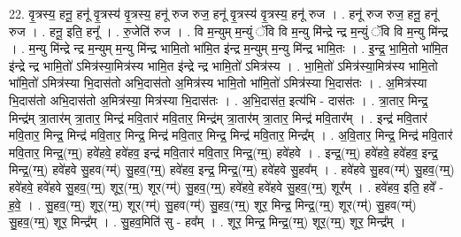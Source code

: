 \documentclass[17pt]{extarticle}
\begin{document}
22. वृ॒त्रस्य॒ हनू॒ हनू॑ वृ॒त्रस्य॑ वृ॒त्रस्य॒ हनू॑ रुज रुज॒ हनू॑ वृ॒त्रस्य॑ वृ॒त्रस्य॒ हनू॑ रुज । . हनू॑ रुज रुज॒ हनू॒ हनू॑ रुज । . हनू॒ इति॒ हनू᳚ । . रु॒जेति॑ रुज । . वि म॒न्युम् म॒न्युं ॅवि वि म॒न्यु मि॑न्द्रे न्द्र म॒न्युं ॅवि वि म॒न्यु मि॑न्द्र । . म॒न्यु मि॑न्द्रे न्द्र म॒न्युम् म॒न्यु मि॑न्द्र भामि॒तो भा॑मि॒त इ॑न्द्र म॒न्युम् म॒न्यु मि॑न्द्र भामि॒तः । . इ॒न्द्र॒ भा॒मि॒तो भा॑मि॒त इ॑न्द्रे न्द्र भामि॒तो॑ ऽमित्र॑स्या॒मित्र॑स्य भामि॒त इ॑न्द्रे न्द्र भामि॒तो॑ ऽमित्र॑स्य । . भा॒मि॒तो॑ ऽमित्र॑स्या॒मित्र॑स्य भामि॒तो भा॑मि॒तो॑ ऽमित्र॑स्या भि॒दास॑तो अभि॒दास॑तो अ॒मित्र॑स्य भामि॒तो भा॑मि॒तो॑ ऽमित्र॑स्या भि॒दास॑तः । . अ॒मित्र॑स्या भि॒दास॑तो अभि॒दास॑तो अ॒मित्र॑स्या॒ मित्र॑स्या भि॒दास॑तः । . अ॒भि॒दास॑त॒ इत्य॑भि - दास॑तः । . त्रा॒तार॒ मिन्द्र॒ मिन्द्र॑म् त्रा॒तार॑म् त्रा॒तार॒ मिन्द्र॑ मवि॒तार॑ मवि॒तार॒ मिन्द्र॑म् त्रा॒तार॑म् त्रा॒तार॒ मिन्द्र॑ मवि॒तार᳚म् । . इन्द्र॑ मवि॒तार॑ मवि॒तार॒ मिन्द्र॒ मिन्द्र॑ मवि॒तार॒ मिन्द्र॒ मिन्द्र॑ मवि॒तार॒ मिन्द्र॒ मिन्द्र॑ मवि॒तार॒ मिन्द्र᳚म् । . अ॒वि॒तार॒ मिन्द्र॒ मिन्द्र॑ मवि॒तार॑ मवि॒तार॒ मिन्द्र॒(ग्म्॒) हवे॑हवे॒ हवे॑हव॒ इन्द्र॑ मवि॒तार॑ मवि॒तार॒ मिन्द्र॒(ग्म्॒) हवे॑हवे । . इन्द्र॒(ग्म्॒) हवे॑हवे॒ हवे॑हव॒ इन्द्र॒ मिन्द्र॒(ग्म्॒) हवे॑हवे सु॒हव(ग्म्॑) सु॒हव॒(ग्म्॒) हवे॑हव॒ इन्द्र॒ मिन्द्र॒(ग्म्॒) हवे॑हवे सु॒हव᳚म् । . हवे॑हवे सु॒हव(ग्म्॑) सु॒हव॒(ग्म्॒) हवे॑हवे॒ हवे॑हवे सु॒हव॒(ग्म्॒) शूर॒(ग्म्॒) शूर(ग्म्॑) सु॒हव॒(ग्म्॒) हवे॑हवे॒ हवे॑हवे सु॒हव॒(ग्म्॒) शूर᳚म् । . हवे॑हव॒ इति॒ हवे᳚ - ह॒वे॒ । . सु॒हव॒(ग्म्॒) शूर॒(ग्म्॒) शूर(ग्म्॑) सु॒हव(ग्म्॑) सु॒हव॒(ग्म्॒) शूर॒ मिन्द्र॒ मिन्द्र॒(ग्म्॒) शूर(ग्म्॑) सु॒हव(ग्म्॑) सु॒हव॒(ग्म्॒) शूर॒ मिन्द्र᳚म् । . सु॒हव॒मिति॑ सु - हव᳚म् । . शूर॒ मिन्द्र॒ मिन्द्र॒(ग्म्॒) शूर॒(ग्म्॒) शूर॒ मिन्द्र᳚म् । \newline
\end{document}
